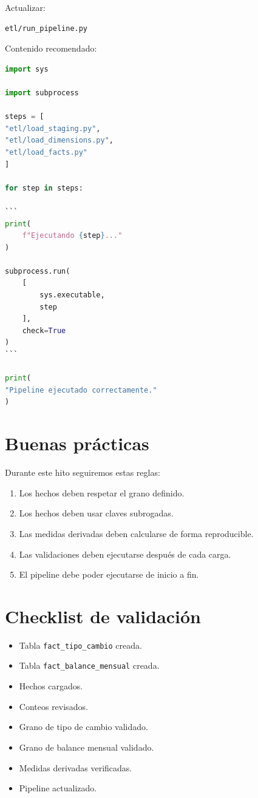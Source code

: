 Actualizar:

\begin{verbatim}
etl/run_pipeline.py
\end{verbatim}

Contenido recomendado:

\begin{lstlisting}[language=Python]
import sys

import subprocess

steps = [
"etl/load_staging.py",
"etl/load_dimensions.py",
"etl/load_facts.py"
]

for step in steps:

```
print(
    f"Ejecutando {step}..."
)

subprocess.run(
    [
        sys.executable,
        step
    ],
    check=True
)
```

print(
"Pipeline ejecutado correctamente."
)
\end{lstlisting}

\section{Buenas prácticas}

Durante este hito seguiremos estas reglas:

\begin{enumerate}
\item Los hechos deben respetar el grano definido.
\item Los hechos deben usar claves subrogadas.
\item Las medidas derivadas deben calcularse de forma reproducible.
\item Las validaciones deben ejecutarse después de cada carga.
\item El pipeline debe poder ejecutarse de inicio a fin.
\end{enumerate}

\section{Checklist de validación}

\begin{itemize}
\item[$\Box$] Tabla \texttt{fact_tipo_cambio} creada.
\item[$\Box$] Tabla \texttt{fact_balance_mensual} creada.
\item[$\Box$] Hechos cargados.
\item[$\Box$] Conteos revisados.
\item[$\Box$] Grano de tipo de cambio validado.
\item[$\Box$] Grano de balance mensual validado.
\item[$\Box$] Medidas derivadas verificadas.
\item[$\Box$] Pipeline actualizado.
\end{itemize}

